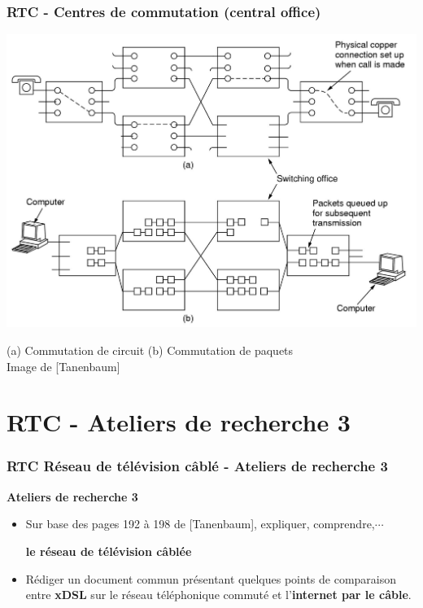 \begin{frame}[fragile]
  \frametitle{RTC - Centres de commutation (central office)}
\begin{center}
	\includegraphics[width=.8\linewidth]{img/2-34-old.jpg}
	\par{\scriptsize (a) Commutation de circuit  (b) Commutation de paquets 
	\\ Image de [Tanenbaum]} 
\end{center}
\end{frame}



\section{RTC - Ateliers de recherche 3}

\begin{frame}[fragile]
	\frametitle{RTC Réseau de télévision câblé - Ateliers de recherche 3}
{\large\bf Ateliers de recherche 3} 
\begin{itemize}
	\item Sur base des pages 192 à 198 de [Tanenbaum], expliquer,
	comprendre,$\cdots$
	\begin{center}
		\textbf{\large le réseau de télévision câblée}
	\end{center}
	\item Rédiger un document commun présentant quelques points de comparaison
	entre \textbf{xDSL} sur le réseau téléphonique commuté et
	l'\textbf{internet par le câble}. 
\end{itemize}
\end{frame}

